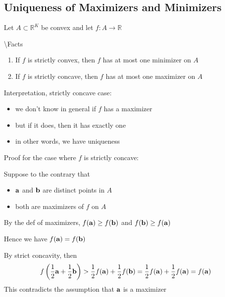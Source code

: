 \documentclass[letterpaper,10pt,english]{jupyterBook}
\begin{document}
\subsection{Uniqueness of Maximizers and Minimizers}
\label{\detokenize{06.optimization_fundamentals:uniqueness-of-maximizers-and-minimizers}}
\sphinxAtStartPar
Let \(A \subset \mathbb{R}^K\) be convex and let \(f \colon A \to \mathbb{R}\)

\sphinxAtStartPar
\textbackslash{}Facts
\begin{enumerate}
%
\item {} 
\sphinxAtStartPar
If \(f\) is strictly convex, then \(f\) has at most one minimizer on \(A\)

\item {} 
\sphinxAtStartPar
If \(f\) is strictly concave, then \(f\) has at most one maximizer on \(A\)

\end{enumerate}

\sphinxAtStartPar
Interpretation, strictly concave case:
\begin{itemize}
\item {} 
\sphinxAtStartPar
we don’t know in general if \(f\) has a maximizer

\item {} 
\sphinxAtStartPar
but if it does, then it has exactly one

\item {} 
\sphinxAtStartPar
in other words, we have uniqueness

\end{itemize}

\sphinxAtStartPar
Proof for the case where \(f\) is strictly concave:

\sphinxAtStartPar
Suppose to the contrary that
\begin{itemize}
\item {} 
\sphinxAtStartPar
\({\bf a}\) and \({\bf b}\) are distinct points in \(A\)

\item {} 
\sphinxAtStartPar
both are maximizers of \(f\) on \(A\)

\end{itemize}

\sphinxAtStartPar
By the def of maximizers, \(f({\bf a}) \geq f({\bf b})\) and \(f({\bf b}) \geq f({\bf a})\)

\sphinxAtStartPar
Hence we have \(f({\bf a}) = f({\bf b})\)

\sphinxAtStartPar
By strict concavity, then
\begin{equation*}
\begin{split}
%
f\left( \frac{1}{2} {\bf a} + \frac{1}{2} {\bf b} \right)
> \frac{1}{2} f( {\bf a}) + \frac{1}{2} f( {\bf b})
= \frac{1}{2} f( {\bf a}) + \frac{1}{2} f( {\bf a})
= f({\bf a})
%
\end{split}
\end{equation*}
\sphinxAtStartPar
This contradicts the assumption that \({\bf a}\) is a maximizer
\end{document}
